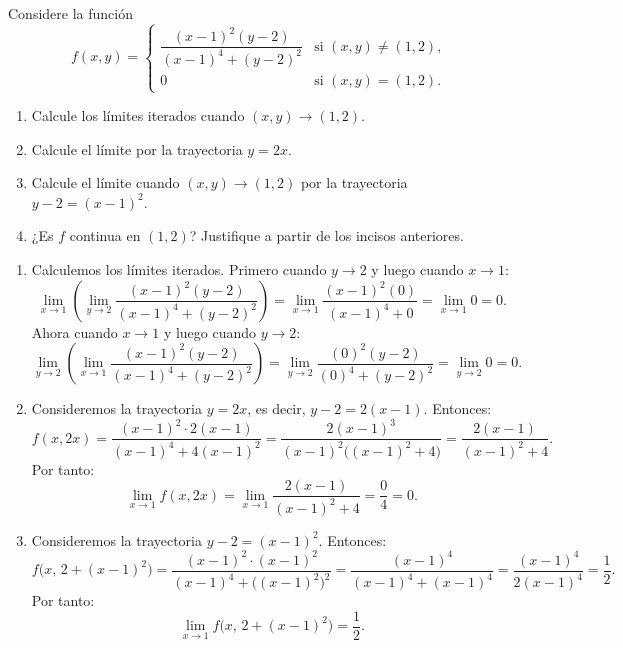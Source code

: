 \documentclass[11pt,respuestas,a4]{aleph-examen}
\begin{document}
\begin{preguntas}

\item
Considere la función
\[
    f(x,y) = \begin{cases}
        \dfrac{(x-1)^2(y-2)}{(x-1)^4 + (y-2)^2} & \text{si } (x,y)\neq(1,2),\\[6pt]
        0 & \text{si } (x,y)=(1,2).
    \end{cases}
\]
\begin{enumerate}[leftmargin=*]
    \item Calcule los límites iterados cuando $(x,y)\to(1,2)$.
    \item Calcule el límite por la trayectoria $y=2x$.
    \item Calcule el límite cuando $(x,y)\to(1,2)$ por la trayectoria $y-2=(x-1)^2$.
    \item ¿Es $f$ continua en $(1,2)$? Justifique a partir de los incisos anteriores.
\end{enumerate}


\begin{respuesta}
\begin{enumerate}
    \item Calculemos los límites iterados. Primero cuando $y\to 2$ y luego cuando $x\to 1$:
    \[
        \lim_{x\to 1}\left(\lim_{y\to 2}\frac{(x-1)^2(y-2)}{(x-1)^4+(y-2)^2}\right)
        =
        \lim_{x\to 1}\frac{(x-1)^2(0)}{(x-1)^4+0}
        =
        \lim_{x\to 1} 0
        =
        0.
    \]
    Ahora cuando $x\to 1$ y luego cuando $y\to 2$:
    \[
        \lim_{y\to 2}\left(\lim_{x\to 1}\frac{(x-1)^2(y-2)}{(x-1)^4+(y-2)^2}\right)
        =
        \lim_{y\to 2}\frac{(0)^2(y-2)}{(0)^4+(y-2)^2}
        =
        \lim_{y\to 2} 0
        =
        0.
    \]

    \item Consideremos la trayectoria $y=2x$, es decir, $y-2=2(x-1)$. Entonces:
    \[
        f(x,2x)
        =
        \frac{(x-1)^2\cdot 2(x-1)}{(x-1)^4+4(x-1)^2}
        =
        \frac{2(x-1)^3}{(x-1)^2\bigl((x-1)^2+4\bigr)}
        =
        \frac{2(x-1)}{(x-1)^2+4}.
    \]
    Por tanto:
    \[
        \lim_{x\to 1} f(x,2x)
        =
        \lim_{x\to 1}\frac{2(x-1)}{(x-1)^2+4}
        =
        \frac{0}{4}
        =
        0.
    \]

    \item Consideremos la trayectoria $y-2=(x-1)^2$. Entonces:
    \[
        f\bigl(x,\,2+(x-1)^2\bigr)
        =
        \frac{(x-1)^2\cdot(x-1)^2}{(x-1)^4+\bigl((x-1)^2\bigr)^2}
        =
        \frac{(x-1)^4}{(x-1)^4+(x-1)^4}
        =
        \frac{(x-1)^4}{2(x-1)^4}
        =
        \frac{1}{2}.
    \]
    Por tanto:
    \[
        \lim_{x\to 1} f\bigl(x,\,2+(x-1)^2\bigr)
        =
        \frac{1}{2}.
    \]


\end{enumerate}
\end{respuesta}
\end{preguntas}
\end{document}

